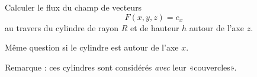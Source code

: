 
\begin{exercice}\label{exomazhe-0001}

    Calculer le flux du champ de vecteurs
    \begin{equation}
        F(x,y,z)=e_x
    \end{equation}
    au travers du cylindre de rayon $R$ et de hauteur $h$ autour de l'axe $z$.

    Même question si le cylindre est autour de l'axe $x$.

Remarque : ces cylindres sont considérés \emph{avec} leur «couvercles».


\end{exercice}
